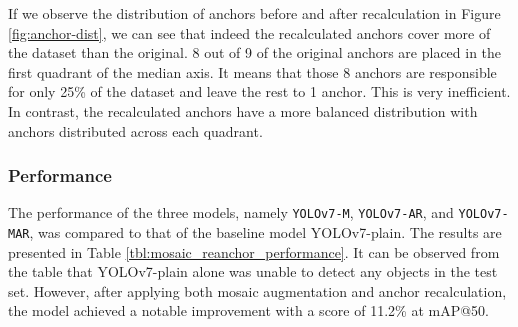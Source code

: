 If we observe the distribution of anchors before and after recalculation in Figure \ref{fig:anchor-dist},
we can see that indeed the recalculated anchors cover more of the dataset than the original.
8 out of 9 of the original anchors are placed in the first quadrant of the median axis.
It means that those 8 anchors are responsible for only 25\% of the dataset and leave the rest to 1 anchor.
This is very inefficient. In contrast, the recalculated anchors have a more balanced distribution with
anchors distributed across each quadrant.





\subsubsection{Performance}
The performance of the three models, namely \verb|YOLOv7-M|, \verb|YOLOv7-AR|, and \verb|YOLOv7-MAR|, was compared to that of the baseline model YOLOv7-plain.
The results are presented in Table \ref{tbl:mosaic_reanchor_performance}.
It can be observed from the table that YOLOv7-plain alone was unable to detect any objects in the test set.
However, after applying both mosaic augmentation and anchor recalculation, the model achieved a notable improvement with a score of 11.2\% at mAP@50. 

\begin{table}
  \centering
  \label{tbl:mosaic_reanchor_performance}
  \vspace{-1ex}
  
\end{table}

